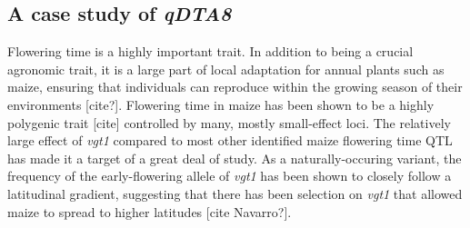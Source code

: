 \documentclass[article,9pt,twocolumn,twoside]{rilabRxiv}
\begin{document}
\subsection{A case study of \emph{qDTA8}}
Flowering time is a highly important trait.
In addition to being a crucial agronomic trait, it is a large part of local adaptation for annual plants such as maize, ensuring that individuals can reproduce within the growing season of their environments [cite?].
Flowering time in maize has been shown to be a highly polygenic trait [cite] controlled by many, mostly small-effect loci.
The relatively large effect of \emph{vgt1} compared to most other identified maize flowering time QTL has made it a target of a great deal of study.
As a naturally-occuring variant, the frequency of the early-flowering allele of \emph{vgt1} has been shown to closely follow a latitudinal gradient, suggesting that there has been selection on \emph{vgt1} that allowed maize to spread to higher latitudes [cite Navarro?].
\end{document}
